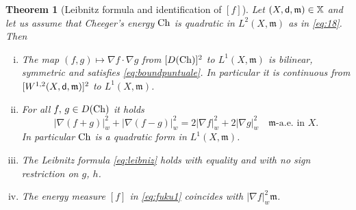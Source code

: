 \documentclass[reqno,11pt]{article}
\numberwithin{equation}{section}
\newcommand{\C}{\mathbb{C}}
\newcommand{\mm}{{\mbox{\boldmath$m$}}}
\newcommand{\sfd}{{\sf d}}
\newtheorem{theorem}{Theorem}[section]
\newcommand{\X}{\mathbb X}
\newcommand{\weakgrad}[1]{|\nabla #1|_w}                %
\renewcommand{\C}{{\rm Ch}}
\renewcommand{\mm}{\mathfrak m}
\begin{document}
%
\begin{theorem}[Leibnitz formula and identification of
  {$[f]$}]\label{thm:tangente}
Let $(X,\sfd,\mm)\in \X$ and let us assume that Cheeger's energy
$\C$ is quadratic in $L^2(X,\mm)$ as in \eqref{eq:18}. Then
\begin{enumerate}[(i)]
\item The map $(f,g)\mapsto\nabla f\cdot\nabla g$ from $[D(\C)]^2$ to
$L^1(X,\mm)$ is bilinear, symmetric and satisfies
\eqref{eq:boundpuntuale}. In particular it is continuous from
$[W^{1,2}(X,\sfd,\mm)]^2$ to $L^1(X,\mm)$.
\item For all $f,\,g\in D(\C)$ it holds
\begin{equation}
  \label{eq:cosimeglio}
  \weakgrad{(f+g)}^2+\weakgrad{(f-g)}^2=2\weakgrad{f}^2+2\weakgrad{g}^2\quad
  \text{$\mm$-a.e.\ in }X.
\end{equation}
In particular $\C$ is a quadratic form in $L^1(X,\mm)$.
\item  The Leibnitz formula \eqref{eq:leibniz} holds with
  equality and with no sign restriction on $g$, $h$.
\item The energy measure
 $[f]$ in \eqref{eq:fuku1} coincides with $\weakgrad{f}^2\mm$.
\end{enumerate}
\end{theorem}
\end{document}
